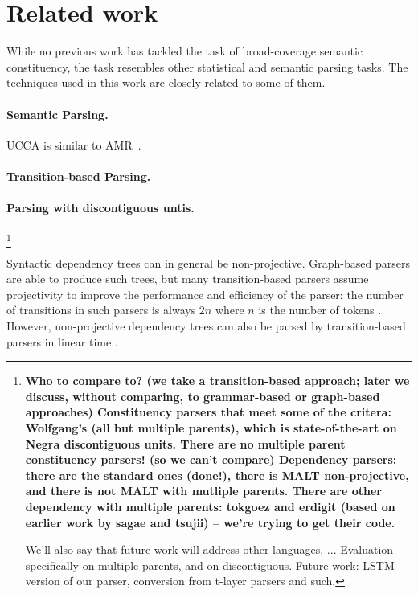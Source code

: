 \documentclass[11pt]{article}
\newcommand{\my}[1]{\footnote{\bf #1}}
\begin{document}
\section{Related work}

While no previous work has tackled the task of broad-coverage semantic constituency, 
the task resembles other statistical and semantic parsing tasks. The techniques used
in this work are closely related to some of them.

\paragraph{Semantic Parsing.}

UCCA is similar to AMR~\cite{flanigan2014discriminative,artzi2015broad}.

\paragraph{Transition-based Parsing.}

\paragraph{Parsing with discontiguous untis.}
\my{Who to compare to? (we take a transition-based approach; later we discuss,
  without comparing, to grammar-based
  or graph-based approaches)
  Constituency parsers that meet some of the critera: Wolfgang's (all but multiple parents),
        which is state-of-the-art on Negra discontiguous units.
        There are no multiple parent constituency parsers! (so we can't compare)
  Dependency parsers: there are the standard ones (done!), there is MALT non-projective, and there is not MALT with mutliple parents. There are other dependency with multiple parents: tokgoez and erdigit (based on earlier work by sagae and tsujii) -- we're trying to get their code.
  
  We'll also say that future work will address other languages, ...
  Evaluation specifically on multiple parents, and on discontiguous.
  Future work: LSTM-version of our parser, conversion from t-layer parsers and such.
}

Syntactic dependency trees can in general be non-projective. Graph-based parsers are able to produce such trees, but many transition-based parsers assume projectivity to improve the performance and efficiency of the parser: the number of transitions in such parsers is always $2n$ where $n$ is the number of tokens \cite{nivre2004incrementality}. However, non-projective dependency trees can also be parsed by transition-based parsers in linear time \cite{nivre2009non}.
\end{document}
